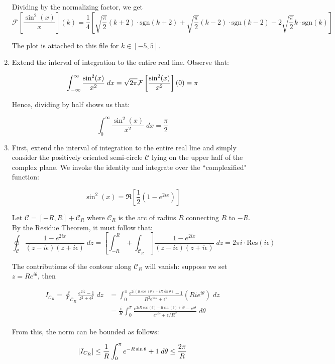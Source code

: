 \documentclass[12pt]{article}%
\newcommand{\foutrans}[1]{\mathcal{F}\left[{#1}\right](k)}
\newcommand{\C}{\mathcal{C}}
\newcommand{\contint}[1][\mathcal{C}]{\oint_{#1}}
\newcommand{\sgn}[1]{\text{sgn}({#1}) }
\begin{document}
\begin{enumerate}
Dividing by the normalizing factor, we get
\[\foutrans{\frac{\sin^2(x)}{x}} = \frac{1}{4 } \left[ \sqrt{\frac{\pi}{2}} (k+2)\cdot \sgn{k+2} + \sqrt{\frac{\pi}{2}} (k-2)\cdot \sgn{k-2} - 2\sqrt{\frac{\pi}{2}}  k \cdot \sgn{k}\right]\]

The plot is attached to this file for $k \in [-5,5]$.


\item
Extend the interval of integration to the entire real line. Observe that:

\[\int_{-\infty}^{\infty} \frac{\sin^2(x)}{x^2} \; dx = \sqrt{2\pi}\mathcal{F}\left[\frac{\sin^2(x)}{x^2}\right](0) = \pi \]

Hence, dividing by half shows us that:

\[\int_0^\infty \frac{\sin^2(x)}{x^2} \; dx = \frac{\pi}{2} \]

  \item
  First, extend the interval of integration to the entire real line and simply consider the positively oriented semi-circle $\C$ lying on the upper half of the complex plane. We invoke the identity and integrate over the ``complexified" function:

  \[ \sin^2(x) = \mathfrak{R}\left[\frac{1}{2}\left(1 -e^{2ix}\right)\right]\]


   Let $\C = [-R,R] + \C_R$ where $\C_R$ is the arc of radius $R$ connecting $R$ to $-R$. By the Residue Theorem, it must follow that:
  \[\contint \frac{1 -e^{2ix}}{(z-i\epsilon)(z+i\epsilon)} \; dz = \left[\int_{-R}^R + \int_{\C_R}\right]  \frac{1 -e^{2ix}}{(z-i\epsilon)(z+i\epsilon)} \; dz = 2\pi i\cdot  \text{Res}(i\epsilon)\]

  The contributions of the contour along $\C_R$ will vanish: suppose we set $z = Re^{i\theta}$, then

  \begin{align*}
I_{\C_R} = \oint_{\C_R} \frac{e^{2iz} -1}{z^2 + \epsilon^2} \; dz  & = \int_0^\pi \frac{e^{2i(R\cos(\theta) + iR\sin{\theta})} - 1}{R^2e^{2i\theta} + \epsilon^2} (Rie^{i\theta}) \; dz \\
& = \frac{i}{R} \int_0^\pi \frac{e^{2iR\cos(\theta) - R\sin(\theta) + i\theta} - e^{i\theta}}{e^{2i\theta} + \epsilon/R^2} \; d\theta
  \end{align*}

From this, the norm can be bounded as follows:

\begin{align*}                                                      \abs{I_{C_R}} \leq  \frac{1}{R} \int_0^\pi e^{-R\sin{\theta}} + 1 \; d\theta \leq \frac{2\pi}{R}
\end{align*}


\end{enumerate}
\end{document}
